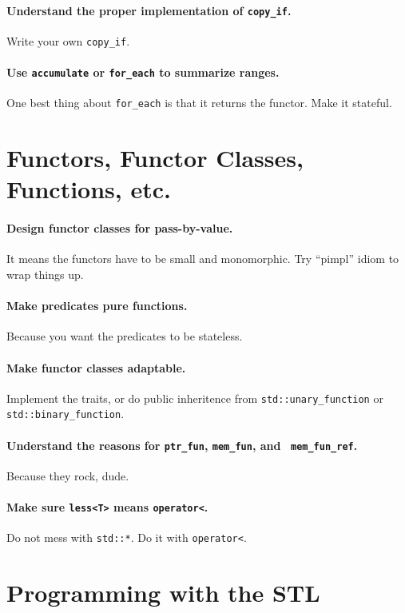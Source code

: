 \documentclass{article}
\begin{document}
\paragraph{Understand the proper implementation of {\tt copy\_if}.} Write your
own {\tt copy\_if}.

\paragraph{Use {\tt accumulate} or {\tt for\_each} to summarize ranges.} One
best thing about {\tt for\_each} is that it returns the functor.  Make it
stateful.

\section{Functors, Functor Classes, Functions, etc.}

\paragraph{Design functor classes for pass-by-value.} It means the functors
have to be small and monomorphic.  Try ``pimpl'' idiom to wrap things up.

\paragraph{Make predicates pure functions.} Because you want the predicates to
be stateless.

\paragraph{Make functor classes adaptable.} Implement the traits, or do public
inheritence from {\tt std::unary\_function} or {\tt std::binary\_function}.

\paragraph{Understand the reasons for {\tt ptr\_fun}, {\tt mem\_fun}, and {\tt
mem\_fun\_ref}.} Because they rock, dude.

\paragraph{Make sure {\tt less<T>} means {\tt operator<}.} Do not mess with
{\tt std::*}.  Do it with {\tt operator<}.

\section{Programming with the STL}
\end{document}
